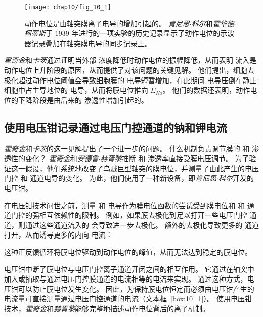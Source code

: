\begin{figure}[htbp]
	\centering
	\texttt{[image: chap10/fig\_10\_1]}
	\caption{动作电位是由轴突膜离子电导的增加引起的。
		\textit{肯尼思$\cdot$科尔}和\textit{霍华德$\cdot$柯蒂斯}于 1939 年进行的一项实验的历史记录显示了动作电位的示波器记录叠加在轴突膜电导的同步记录上。}
	\label{fig:10_1}
\end{figure}


\textit{霍奇金}和\textit{卡茨}通过证明当外部  浓度降低时动作电位的振幅降低，从而表明  流入是动作电位上升阶段的原因，从而提供了对该问题的关键见解。
他们提出，细胞去极化超过动作电位阈值会导致细胞膜的  电导短暂增加，在此期间  电导压倒在静止细胞中占主导地位的  电导，从而将膜电位推向 $E_{Na}$。 
他们的数据还表明，动作电位的下降阶段是由后来的  渗透性增加引起的。



\subsection{使用电压钳记录通过电压门控通道的钠和钾电流}

\textit{霍奇金}和\textit{卡茨}的这一见解提出了一个进一步的问题。
什么机制负责调节膜的  和  渗透性的变化？
\textit{霍奇金}和\textit{安德鲁$\cdot$赫胥黎}推断  和  渗透率直接受膜电压调节。
为了验证这一假设，他们系统地改变了乌贼巨型轴突的膜电位，并测量了由此产生的电压门控  和  通道电导的变化。
为此，他们使用了一种新设备，即\textit{肯尼思$\cdot$科尔}开发的电压钳。



在电压钳技术问世之前，测量  和  电导作为膜电位函数的尝试受到膜电位和  和  通道门控的强相互依赖性的限制。
例如，如果膜去极化到足以打开一些电压门控  通道，则通过这些通道流入的  会导致进一步去极化。 
额外的去极化导致更多的  通道打开，从而诱导更多的内向  电流：


这种正反馈循环将膜电位驱动到动作电位的峰值，从而无法达到稳定的膜电位。


电压钳中断了膜电位与电压门控离子通道开闭之间的相互作用。
它通过在轴突中加入或抽取与通过电压门控膜通道的电流相等的电流来实现。
通过这种方式，电压钳可以防止膜电位发生变化。
因此，为保持膜电位恒定而必须由电压钳产生的电流量可直接测量通过电压门控通道的电流（文本框~\ref{box:10_1}）。
使用电压钳技术，\textit{霍奇金}和\textit{赫胥黎}能够完整地描述动作电位背后的离子机制。


